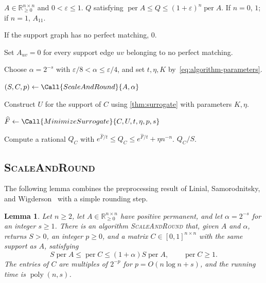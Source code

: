 \documentclass[11pt,reqno,letterpaper]{amsart}
\numberwithin{equation}{section}
\newtheorem{lemma}[lemma]{Lemma}
\theoremstyle{definition}
\theoremstyle{remark}
\newcommand{\wh}{\widehat}
\newcommand{\R}{\mathbb R}
\DeclareMathOperator{\per}{per}
\begin{document}
\begin{algorithm}[htbp]
\caption{Deterministic approximation of the nonnegative permanent}
\label{alg:permanent}
\begin{algorithmic}[1]
\Require $A\in\R_{\ge0}^{n\times n}$ and $0<\varepsilon\le1$.
\Ensure $Q$ satisfying $\per A\le Q\le(1+\varepsilon)^n\per A$.
\State If $n=0$, \Return $1$; if $n=1$, \Return $A_{11}$.

\State If the support graph has no perfect matching, \Return $0$.

\State Set $A_{uv}=0$ for every support edge $uv$ belonging to no perfect matching.

\State Choose $\alpha=2^{-s}$ with
$\varepsilon/8<\alpha\le\varepsilon/4$, and set
$t,\eta,K$ by~\cref{eq:algorithm-parameters}.

\State $(S,C,p)\gets\Call{ScaleAndRound}{A,\alpha}$

\State Construct $U$ for the support of $C$ using
\cref{thm:surrogate} with parameters $K,\eta$.

\State $\widehat F\gets\Call{MinimizeSurrogate}{C,U,t,\eta,p,s}$

\State Compute a rational $Q_C$ with
$e^{\wh{F}/t}\le Q_C\le e^{\wh{F}/t}+\eta n^{-n}$.
\label{line:exponential}
\State \Return $Q_C/S$.

\end{algorithmic}
\end{algorithm}

\subsection{\textsc{ScaleAndRound}}\label{sec:scale-and-round}
The following lemma combines the preprocessing result of Linial,
Samorodnitsky, and Wigderson~\cite{LSW} with a simple rounding step.

\begin{lemma}\label{lem:scale-and-round}
Let $n\ge2$, let $A\in\R_{\ge0}^{n\times n}$ have positive permanent,
and let $\alpha=2^{-s}$ for an integer $s\ge1$.
There is an algorithm \emph{\textsc{ScaleAndRound}} that, given
$A$ and $\alpha$, returns $S>0$, an integer $p\ge0$, and a matrix
$C\in[0,1]^{n\times n}$ with the same support as $A$, satisfying
\begin{equation*}
 S\per A\le\per C\le(1+\alpha)S\per A,
 \qquad \per C\ge1.
\end{equation*}
The entries of $C$ are multiples of $2^{-p}$ for
$p=O(n\log n+s)$, and the running time is
$\operatorname{poly}(n,s)$.
\end{lemma}
\end{document}
